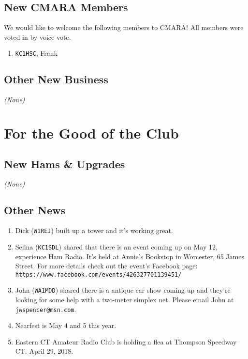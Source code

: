 \documentclass[10pt,letterpaper]{article}
\begin{document}
\subsection{New CMARA Members}
\label{new-cmara-members}
We would like to welcome the following members to CMARA! All members were voted in by voice vote.
\begin{enumerate}
  \item \texttt{KC1HSC}, Frank
\end{enumerate}

\subsection{Other New Business}
\emph{(None)}

\section{For the Good of the Club}

\subsection{New Hams \& Upgrades}
\emph{(None)}

\subsection{Other News}
\begin{enumerate}
  \item Dick (\texttt{W1REJ}) built up a tower and it's working great.
  \item Selina (\texttt{KC1SDL}) shared that there is an event coming up on May 12, experience Ham Radio. It's held at Annie's Bookstop in Worcester, 65 James Street. For more details check out the event's Facebook page: \\ \texttt{https://www.facebook.com/events/426327701139451/}
  \item John (\texttt{WA1MDD}) shared there is a antique car show coming up and they're looking for some help with a two-meter simplex net. Please email John at \texttt{jwspencer@msn.com}.
  \item Nearfest is May 4 and 5 this year.
  \item Eastern CT Amateur Radio Club is holding a flea at Thompson Speedway CT. April 29, 2018.
\end{enumerate}
\end{document}

